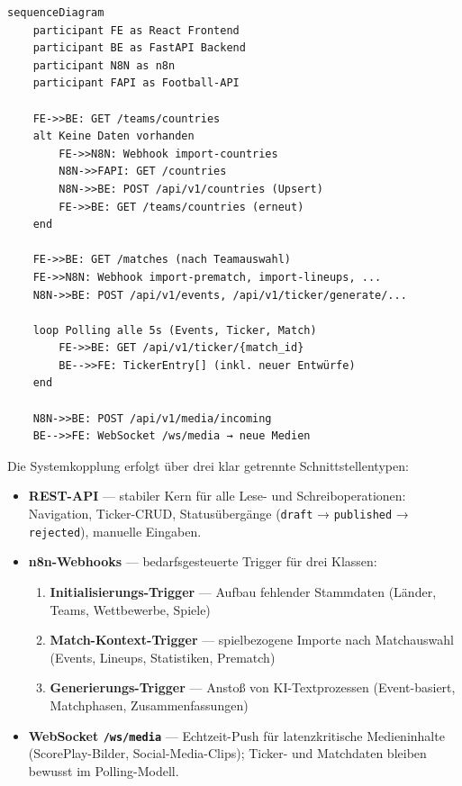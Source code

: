 \begin{lstlisting}
sequenceDiagram
    participant FE as React Frontend
    participant BE as FastAPI Backend
    participant N8N as n8n
    participant FAPI as Football-API

    FE->>BE: GET /teams/countries
    alt Keine Daten vorhanden
        FE->>N8N: Webhook import-countries
        N8N->>FAPI: GET /countries
        N8N->>BE: POST /api/v1/countries (Upsert)
        FE->>BE: GET /teams/countries (erneut)
    end

    FE->>BE: GET /matches (nach Teamauswahl)
    FE->>N8N: Webhook import-prematch, import-lineups, ...
    N8N->>BE: POST /api/v1/events, /api/v1/ticker/generate/...

    loop Polling alle 5s (Events, Ticker, Match)
        FE->>BE: GET /api/v1/ticker/{match_id}
        BE-->>FE: TickerEntry[] (inkl. neuer Entwürfe)
    end

    N8N->>BE: POST /api/v1/media/incoming
    BE-->>FE: WebSocket /ws/media → neue Medien
\end{lstlisting}

Die Systemkopplung erfolgt über drei klar getrennte Schnittstellentypen:

\begin{itemize}
\tightlist
\item
  \textbf{REST-API} --- stabiler Kern für alle Lese- und
  Schreiboperationen: Navigation, Ticker-CRUD, Statusübergänge
  (\passthrough{\lstinline!draft!} → \passthrough{\lstinline!published!}
  → \passthrough{\lstinline!rejected!}), manuelle Eingaben.
\item
  \textbf{n8n-Webhooks} --- bedarfsgesteuerte Trigger für drei Klassen:

  \begin{enumerate}
  \def\labelenumi{\arabic{enumi}.}
  \tightlist
  \item
    \textbf{Initialisierungs-Trigger} --- Aufbau fehlender Stammdaten
    (Länder, Teams, Wettbewerbe, Spiele)
  \item
    \textbf{Match-Kontext-Trigger} --- spielbezogene Importe nach
    Matchauswahl (Events, Lineups, Statistiken, Prematch)
  \item
    \textbf{Generierungs-Trigger} --- Anstoß von KI-Textprozessen
    (Event-basiert, Matchphasen, Zusammenfassungen)
  \end{enumerate}
\item
  \textbf{WebSocket \passthrough{\lstinline!/ws/media!}} ---
  Echtzeit-Push für latenzkritische Medieninhalte (ScorePlay-Bilder,
  Social-Media-Clips); Ticker- und Matchdaten bleiben bewusst im
  Polling-Modell.
\end{itemize}

